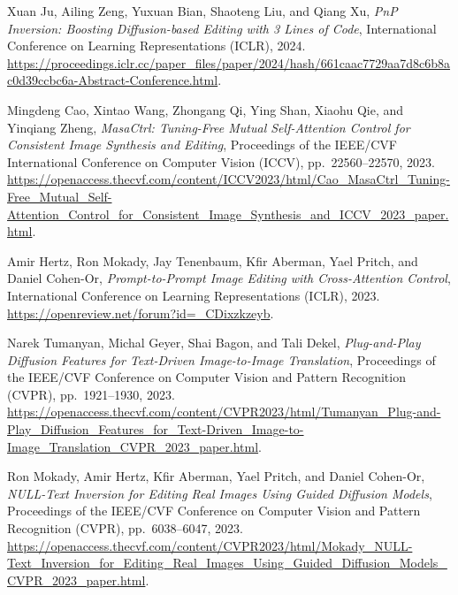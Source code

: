 
Xuan Ju, Ailing Zeng, Yuxuan Bian, Shaoteng Liu, and Qiang Xu,
\textit{PnP Inversion: Boosting Diffusion-based Editing with 3 Lines of Code},
International Conference on Learning Representations (ICLR), 2024.
\url{https://proceedings.iclr.cc/paper_files/paper/2024/hash/661caac7729aa7d8c6b8ac0d39ccbc6a-Abstract-Conference.html}.

Mingdeng Cao, Xintao Wang, Zhongang Qi, Ying Shan, Xiaohu Qie, and Yinqiang Zheng,
\textit{MasaCtrl: Tuning-Free Mutual Self-Attention Control for Consistent Image Synthesis and Editing},
Proceedings of the IEEE/CVF International Conference on Computer Vision (ICCV), pp.~22560--22570, 2023.
\url{https://openaccess.thecvf.com/content/ICCV2023/html/Cao_MasaCtrl_Tuning-Free_Mutual_Self-Attention_Control_for_Consistent_Image_Synthesis_and_ICCV_2023_paper.html}.

Amir Hertz, Ron Mokady, Jay Tenenbaum, Kfir Aberman, Yael Pritch, and Daniel Cohen-Or,
\textit{Prompt-to-Prompt Image Editing with Cross-Attention Control},
International Conference on Learning Representations (ICLR), 2023.
\url{https://openreview.net/forum?id=_CDixzkzeyb}.

Narek Tumanyan, Michal Geyer, Shai Bagon, and Tali Dekel,
\textit{Plug-and-Play Diffusion Features for Text-Driven Image-to-Image Translation},
Proceedings of the IEEE/CVF Conference on Computer Vision and Pattern Recognition (CVPR), pp.~1921--1930, 2023.
\url{https://openaccess.thecvf.com/content/CVPR2023/html/Tumanyan_Plug-and-Play_Diffusion_Features_for_Text-Driven_Image-to-Image_Translation_CVPR_2023_paper.html}.

Ron Mokady, Amir Hertz, Kfir Aberman, Yael Pritch, and Daniel Cohen-Or,
\textit{NULL-Text Inversion for Editing Real Images Using Guided Diffusion Models},
Proceedings of the IEEE/CVF Conference on Computer Vision and Pattern Recognition (CVPR), pp.~6038--6047, 2023.
\url{https://openaccess.thecvf.com/content/CVPR2023/html/Mokady_NULL-Text_Inversion_for_Editing_Real_Images_Using_Guided_Diffusion_Models_CVPR_2023_paper.html}.

